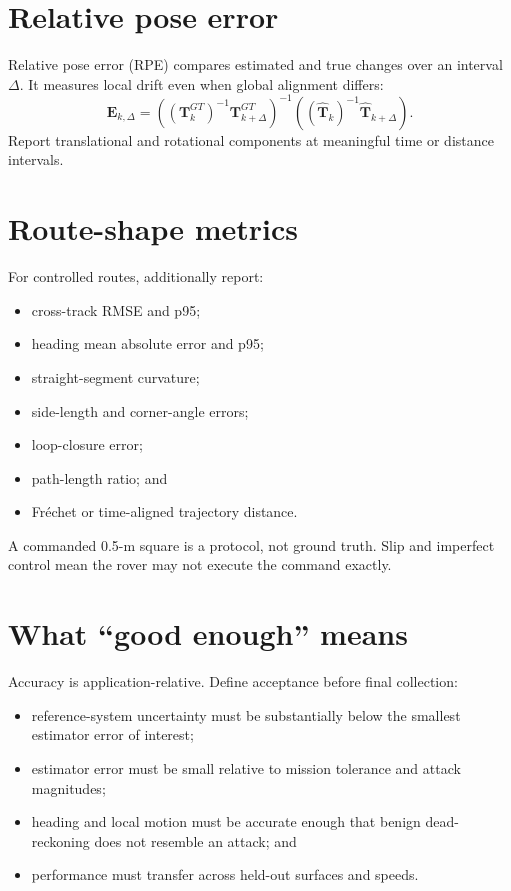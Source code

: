 \documentclass[11pt,oneside]{book}
\newcommand{\vect}[1]{\bm{#1}}
\begin{document}
\section{Relative pose error}

Relative pose error (RPE) compares estimated and true changes over an interval
$\Delta$. It measures local drift even when global alignment differs:
\[
\vect{E}_{k,\Delta}=
\left((\vect{T}^{GT}_k)^{-1}\vect{T}^{GT}_{k+\Delta}\right)^{-1}
\left((\hat{\vect{T}}_k)^{-1}\hat{\vect{T}}_{k+\Delta}\right).
\]
Report translational and rotational components at meaningful time or distance
intervals.

\section{Route-shape metrics}

For controlled routes, additionally report:
\begin{itemize}
  \item cross-track RMSE and p95;
  \item heading mean absolute error and p95;
  \item straight-segment curvature;
  \item side-length and corner-angle errors;
  \item loop-closure error;
  \item path-length ratio; and
  \item Fr\'echet or time-aligned trajectory distance.
\end{itemize}

A commanded 0.5-m square is a protocol, not ground truth. Slip and imperfect
control mean the rover may not execute the command exactly.

\section{What ``good enough'' means}

Accuracy is application-relative. Define acceptance before final collection:
\begin{itemize}
  \item reference-system uncertainty must be substantially below the smallest
  estimator error of interest;
  \item estimator error must be small relative to mission tolerance and attack
  magnitudes;
  \item heading and local motion must be accurate enough that benign
  dead-reckoning does not resemble an attack; and
  \item performance must transfer across held-out surfaces and speeds.
\end{itemize}
\end{document}
